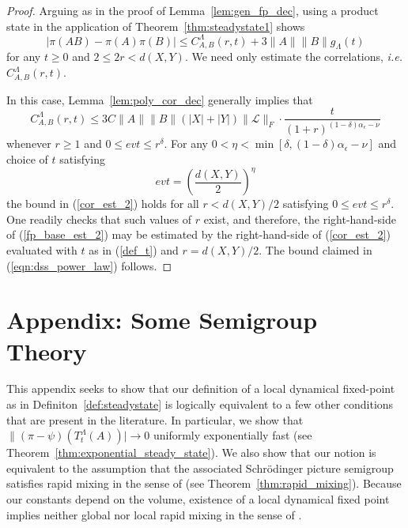 \documentclass{article}
\newcommand{\<}{\langle}
\renewcommand{\>}{\rangle}
\numberwithin{equation}{section}
\theoremstyle{definition}
\begin{document}
\begin{proof}
Arguing as in the proof of Lemma~\ref{lem:gen_fp_dec}, using a product state in the application of Theorem~\ref{thm:steadystate1} shows 
\begin{equation} \label{fp_base_est_2}
  |\pi(AB) - \pi(A) \pi(B)| \leq  C_{A,B}^{\Lambda}(r,t) + 3 \| A \| \| B \| g_{\Lambda}(t) 
 \end{equation}
for any $t \geq 0$ and $2\leq 2r<d(X,Y)$. We need only estimate the correlations, \textit{i.e.} $C_{A,B}^{\Lambda}(r,t)$. 

In this case, Lemma~\ref{lem:poly_cor_dec} generally implies that
\begin{equation} \label{cor_est_2}
C_{A,B}^{\Lambda}(r,t) \leq  3 C \| A \| \| B \| \left( |X| + |Y| \right) \| \mathscr{L} \|_F \cdot \frac{t}{(1+ r)^{(1- \delta) \alpha_{\epsilon} - \nu}}
\end{equation}
whenever $r \geq 1$ and $0 \leq evt \leq r^{\delta}$. For any $0< \eta < \min[ \delta, (1- \delta) \alpha_{\epsilon} - \nu]$ and choice of $t$ satisfying
\begin{equation} \label{def_t}
evt = \left( \frac{d(X,Y)}{2} \right)^{\eta}
\end{equation}
the bound in (\ref{cor_est_2}) holds for all $r< d(X,Y)/2$ satisfying $0 \leq evt \leq r^{\delta}$. One readily checks that such values of $r$
exist, and therefore, the right-hand-side of (\ref{fp_base_est_2}) may be estimated by the right-hand-side of (\ref{cor_est_2}) evaluated with $t$ as in (\ref{def_t}) and
$r=d(X,Y)/2$. The bound claimed in (\ref{eqn:dss_power_law}) follows.
\end{proof}

\appendix
\renewcommand{\thesection}{\Alph{section}}
\renewcommand{\thesubsection}{A.\Roman{subsection}}

\section{Appendix: Some Semigroup Theory}
This appendix seeks to show that our definition of a local dynamical fixed-point as in Definiton~\ref{def:steadystate} is logically equivalent to a few other conditions that are present in the literature. In particular, we show that  $\|(\pi - \psi)(T^{\Lambda}_t(A))| \to 0$ uniformly exponentially fast (see Theorem~\ref{thm:exponential_steady_state}). We also show that our notion is equivalent to the assumption that the associated Schr\"odinger picture semigroup satisfies rapid mixing in the sense of \cite[Theorem 1]{KastoryanoEisert}  (see Theorem~\ref{thm:rapid_mixing}). Because our constants depend on the volume, existence of a local dynamical fixed point implies neither global nor local rapid mixing in the sense of \cite{Brandao, Cubitt}. 
\end{document}
